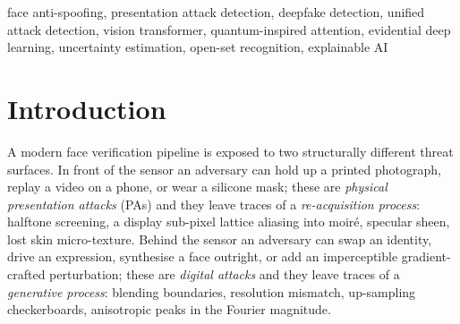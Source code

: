 \documentclass[conference]{IEEEtran}
\begin{document}
\begin{abstract}
CDCN++ re-implemented and trained under an identical budget. On the closed-set
protocol the three convolutional and hybrid detectors are all close to the ceiling
(ACER $0.71$--$1.46\%$, AUC $\approx99.9\%$); X-UAD gives the lowest calibration error of any
model that actually detects ($1.94\%$ ECE, against $2.11\%$ and $3.44\%$; the plain
transformer's $0.67\%$ is the degenerate calibration of a near-chance classifier)
and the best evidence localisation ($77.8\%$ region-level IoU), while trailing the
best baseline by $0.75$ ACER points. Under leave-one-attack-out it
attains the best mean detection rate on families it has never seen ($77.5\%$) and
the best novelty AUROC on half the folds, and pseudo-unseen suppression is worth
$+5.4$ AUROC points on that channel. We also report a negative result the field
should know: under a severe capture-domain shift \emph{every} method in the
comparison collapses. Code, benchmark generator and configurations that map the
identical pipeline onto the public capture-based corpora are released.
\end{abstract}

\begin{IEEEkeywords}
face anti-spoofing, presentation attack detection, deepfake detection, unified
attack detection, vision transformer, quantum-inspired attention, evidential deep
learning, uncertainty estimation, open-set recognition, explainable AI
\end{IEEEkeywords}

\section{Introduction}

A modern face verification pipeline is exposed to two structurally different threat
surfaces. In front of the sensor an adversary can hold up a printed photograph,
replay a video on a phone, or wear a silicone mask; these are
\emph{physical presentation attacks} (PAs) and they leave traces of a
\emph{re-acquisition process}: halftone screening, a display sub-pixel lattice
aliasing into moir\'e, specular sheen, lost skin micro-texture. Behind the sensor
an adversary can swap an identity, drive an expression, synthesise a face outright,
or add an imperceptible gradient-crafted perturbation; these are \emph{digital
attacks} and they leave traces of a \emph{generative process}: blending boundaries,
resolution mismatch, up-sampling checkerboards, anisotropic peaks in the Fourier
magnitude.
\end{document}

